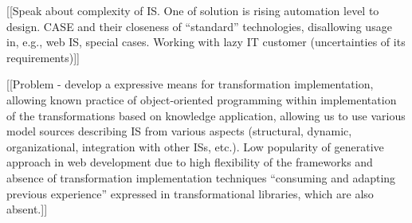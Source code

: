 \documentclass[conference]{IEEEtran}
\begin{document}




[[Speak about complexity of IS. One of solution is rising automation level to design. CASE and their closeness of ``standard'' technologies, disallowing usage in, e.g., web IS, special cases. Working with lazy IT customer (uncertainties of its requirements)]]

[[Problem - develop a expressive means for transformation implementation, allowing known practice of object-oriented programming within implementation of the transformations based on knowledge application, allowing us to use various model sources describing IS from various aspects (structural, dynamic, organizational, integration with other ISs, etc.).  Low popularity of generative approach in web development due to high flexibility of the frameworks and absence of transformation implementation techniques ``consuming and adapting previous experience'' expressed in transformational libraries, which are also absent.]]
\end{document}
